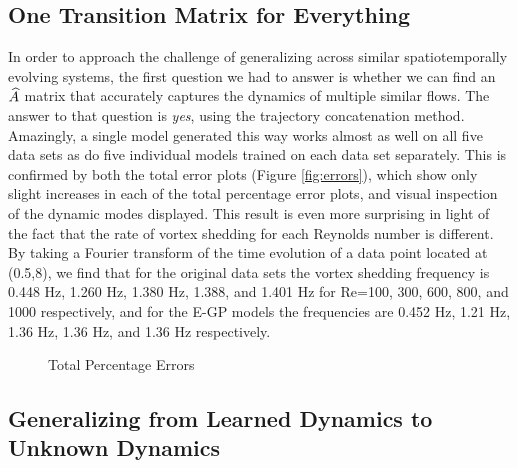 \subsection{One Transition Matrix for Everything}\label{sec:lotr}

In order to approach the challenge of generalizing across similar spatiotemporally evolving systems, the first question we had to answer is whether we can find an $\widehat{A}$ matrix that accurately captures the dynamics of multiple similar flows. The answer to that question is \textit{yes}, using the trajectory concatenation method. Amazingly, a single model generated this way works almost as well on all five data sets as do five individual models trained on each data set separately. This is confirmed by both the total error plots (Figure \ref{fig:errors}), which show only slight increases in each of the total percentage error plots, and visual inspection of the dynamic modes displayed. This result is even more surprising in light of the fact that the rate of vortex shedding for each Reynolds number is different. By taking a Fourier transform of the time evolution of a data point located at (0.5,8), we find that for the original data sets the vortex shedding frequency is 0.448 Hz, 1.260 Hz, 1.380 Hz, 1.388, and 1.401 Hz for Re=100, 300, 600, 800, and 1000 respectively, and for the E-GP models the frequencies are 0.452 Hz, 1.21 Hz, 1.36 Hz, 1.36 Hz, and 1.36 Hz respectively.

\begin{figure}[h] %
	\centering
	\caption{Total Percentage Errors}
\end{figure}

\subsection{Generalizing from Learned Dynamics to Unknown Dynamics}\label{sec:generalize}

